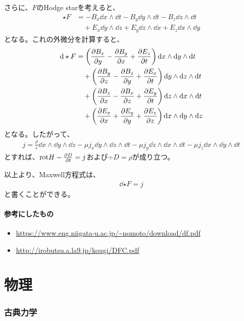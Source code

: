 \documentclass[a4paper,11pt]{jsarticle}
\numberwithin{equation}{section}
\begin{document}
さらに、$F$のHodge starを考えると、
\begin{align}
  \star F &= -B_x \dd{x} \wedge \dd{t} - B_y \dd{y} \wedge \dd{t} - B_z \dd{z} \wedge \dd{t} \\
  &\quad + E_x \dd{y} \wedge \dd{z} + E_y \dd{z} \wedge \dd{x} + E_z \dd{x} \wedge \dd{y}
\end{align}
となる。これの外微分を計算すると、
\begin{align}
  \dd \star F &= \qty(\pdv{B_x}{y} - \pdv{B_y}{x} + \pdv{E_z}{t})\dd{x} \wedge \dd{y} \wedge \dd{t}\\
  &\quad + \qty(\pdv{B_y}{z} - \pdv{B_z}{y} + \pdv{E_x}{t})\dd{y} \wedge \dd{z} \wedge \dd{t}\\
  &\quad + \qty(\pdv{B_z}{x} - \pdv{B_x}{z} + \pdv{E_y}{t})\dd{z} \wedge \dd{x} \wedge \dd{t}\\
  &\quad + \qty(\pdv{E_x}{x} + \pdv{E_y}{y} + \pdv{E_z}{z})\dd{x} \wedge \dd{y} \wedge \dd{z}
\end{align}
となる。したがって、
\begin{align}
  j = \frac{\rho}{\epsilon} \dd{x} \wedge \dd{y} \wedge \dd{z} -\mu j_x \dd{y} \wedge \dd{z} \wedge \dd{t} -\mu  j_y \dd{z} \wedge \dd{x} \wedge \dd{t} -\mu  j_z \dd{x} \wedge \dd{y} \wedge \dd{t}
\end{align}
とすれば、$\text{rot} H - \pdv{D}{t} = j$および$\div{D} = \rho$が成り立つ。

以上より、Maxwell方程式は、
\begin{align}
  \dd{\star F} = j
\end{align}
と書くことができる。

\subsection{参考にしたもの}
\begin{itemize}
  \item \url{https://www.eng.niigata-u.ac.jp/~nomoto/download/df.pdf}
  \item \url{http://irobutsu.a.la9.jp/kougi/DFC.pdf}
\end{itemize}

\part{物理}
\section{古典力学}
\end{document}
